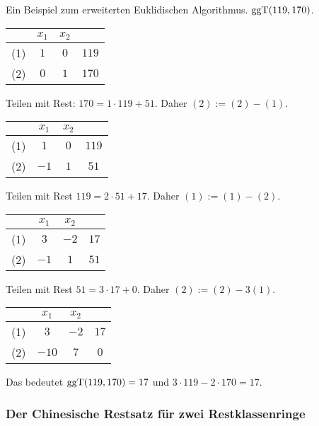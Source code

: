	\begin{bsp} 
		Ein Beispiel zum erweiterten Euklidischen Algorithmus. $\operatorname{ggT}(119,170)$. 
		
		\begin{center}
			\begin{tabular}{c|cc|c}
				& $x_1$ & $x_2$ & 
				\\ \hline 
				(1) & $1$ & $0$ & $119$ 
				\\		(2) & $0$  & $1$ & $170$
			\end{tabular}
		\end{center}  
		
		Teilen mit Rest: $170 = 1 \cdot 119 + 51$. Daher $(2) := (2) - (1)$. 
		
		\begin{center}
			\begin{tabular}{c|cc|c}
				& $x_1$ & $x_2$ & 
				\\ \hline 
				(1) & $1$ & $0$ & $119$ 
				\\		(2) & $-1$  & $1$ & $51$
			\end{tabular} 
		\end{center} 
		
		Teilen mit Rest $119 =2 \cdot 51 + 17$. Daher $(1):= (1) - (2)$. 
		
		\begin{center}
			\begin{tabular}{c|cc|c}
				& $x_1$ & $x_2$ & 
				\\ \hline 
				(1) & $3$ & $-2$ & $17$ 
				\\		(2) & $-1$  & $1$ & $51$
			\end{tabular} 
		\end{center} 
		
		Teilen mit Rest $51 = 3 \cdot 17 + 0$. Daher $(2) := (2) - 3 (1)$. 
		
		\begin{center}
			\begin{tabular}{c|cc|c}
				& $x_1$ & $x_2$ & 
				\\ \hline 
				(1) & $3$ & $-2$ & $17$ 
				\\		(2) & $-10$  & $7$ & $0$
			\end{tabular} 
		\end{center} 
		
		Das bedeutet $\operatorname{ggT}(119,170) = 17$ und $ 3 \cdot 119 - 2 \cdot 170 = 17$. 
		
		
	\end{bsp} 
	
	
	\subsubsection{Der Chinesische Restsatz für zwei Restklassenringe} 
	
